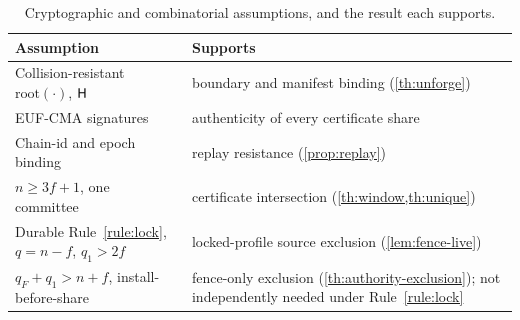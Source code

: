 \begin{table}[t]
\centering
\caption{Cryptographic and combinatorial assumptions, and the result each supports.}
\label{tab:crypto}
\small
\renewcommand{\arraystretch}{1.14}
\begin{tabular}{@{}L{0.42\columnwidth}L{0.52\columnwidth}@{}}
\toprule
\textbf{Assumption} & \textbf{Supports} \\
\midrule
Collision-resistant $\mathrm{root}(\cdot)$, $\mathsf{H}$ & boundary and manifest binding (\cref{th:unforge}) \\
EUF-CMA signatures & authenticity of every certificate share \\
Chain-id and epoch binding & replay resistance (\cref{prop:replay}) \\
$n\ge3f+1$, one committee & certificate intersection (\cref{th:window,th:unique}) \\
Durable Rule~\ref{rule:lock}, $q=n-f$, $q_1>2f$ & locked-profile source exclusion (\cref{lem:fence-live}) \\
$q_F+q_1>n+f$, install-before-share & fence-only exclusion (\cref{th:authority-exclusion}); not independently needed under Rule~\ref{rule:lock} \\
\bottomrule
\end{tabular}
\end{table}

